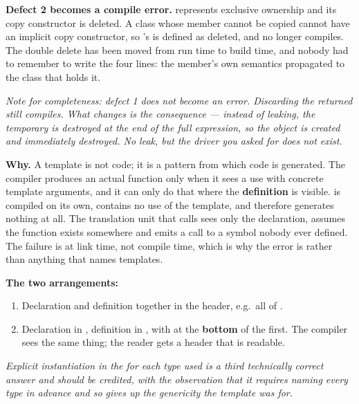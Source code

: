 \textbf{Defect 2 becomes a compile error.}  represents exclusive ownership and
its copy constructor is deleted. A class whose member cannot be copied cannot have an implicit copy
constructor, so 's is defined as deleted, and
 no longer compiles. The double delete has been moved from
run time to build time, and nobody had to remember to write the four  lines: the
member's own semantics propagated to the class that holds it. 

\textit{Note for completeness: defect 1 does not become an error. Discarding the returned
 still compiles. What changes is the consequence --- instead of leaking, the
temporary is destroyed at the end of the full expression, so the object is created and immediately
destroyed. No leak, but the driver you asked for does not exist.}


\textbf{Why.} A template is not code; it is a pattern from which code is generated. The compiler
produces an actual function only when it sees a use with concrete template arguments, and it can
only do that where the \textbf{definition} is visible.  is compiled on its own,
contains no use of the template, and therefore generates nothing at all. The translation unit that
calls  sees only the declaration, assumes the function exists somewhere
and emits a call to a symbol nobody ever defined. The failure is at link time, not compile time,
which is why the error is  rather than anything that names templates.

\textbf{The two arrangements:} 
\begin{enumerate}
  \item Declaration and definition together in the header, e.g.\ all of
    .
  \item Declaration in , definition in
    , with  at
    the \textbf{bottom} of the first. The compiler sees the same thing; the reader gets a header
    that is readable.
\end{enumerate}

\textit{Explicit instantiation in the  for each type used is a third technically correct
answer and should be credited, with the observation that it requires naming every type in advance
and so gives up the genericity the template was for.}

